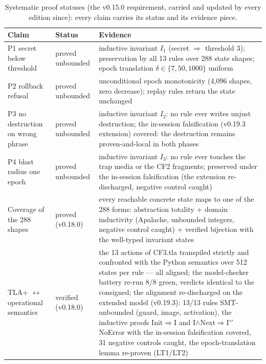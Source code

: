\begingroup\scriptsize
\begin{longtable}{@{}p{3.4cm} p{2.9cm} p{8.4cm}@{}}
\caption{Systematic proof statuses (the v0.15.0 requirement, carried and updated by every edition since): every claim carries its status and its evidence piece.}\label{tab:statuts}\\
\toprule
\textbf{Claim} & \textbf{Status} & \textbf{Evidence} \\
\midrule
\endhead
\bottomrule
\endfoot
P1 secret below threshold & proved unbounded & inductive invariant $I_1$ (secret $\Rightarrow$ threshold 3); preservation by all 13 rules over 288 state shapes; epoch translation $\delta\in\{7,50,1000\}$ uniform \\
P2 rollback refusal & proved unbounded & unconditional epoch monotonicity (4{,}096 shapes, zero decrease); replay rules return the state unchanged \\
P3 no destruction on wrong phrase & proved unbounded & inductive invariant $I_2$: no rule ever writes unjust destruction; the in-session falsification (v0.19.3 extension) covered: the destruction remains proven-and-local in both phases \\
P4 blast radius one epoch & proved unbounded & inductive invariant $I_3$: no rule ever touches the trap media or the CF2 fragments; preserved under the in-session falsification (the extension re-discharged, negative control caught) \\
Coverage of the 288 shapes & proved (v0.18.0) & every reachable concrete state maps to one of the 288 forms: abstraction totality + domain inductivity (Apalache, unbounded integers, negative control caught) + verified bijection with the well-typed invariant states \\
TLA+ $\leftrightarrow$ operational semantics & verified (v0.18.0) & the 13 actions of CF3.tla transpiled strictly and confronted with the Python semantics over 512 states per rule --- all aligned; the model-checker battery re-run 8/8 green, verdicts identical to the consigned; the alignment re-discharged on the extended model (v0.19.3): 13/13 rules SMT-unbounded (guard, image, activation), the inductive proofs Init$\Rightarrow$I and I$\wedge$Next$\Rightarrow$I'$'$ NoError with the in-session falsification covered, 31 negative controls caught, the epoch-translation lemma re-proven (LT1/LT2) \\

\end{longtable}

